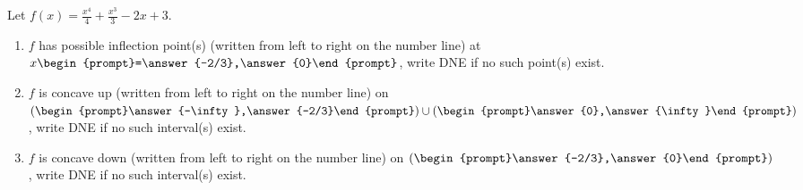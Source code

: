 \documentclass{ximera}
\author{Gregory Hartman \and Matthew Carr}
\begin{document}
\begin{exercise}




Let $f(x)=\frac{x^4}{4}+\frac{x^3}{3}-2x+3$. 
\begin{enumerate}
\item		$f$ has possible inflection point(s) (written from left to right on the number line) at $x\begin{prompt}=\answer{-2/3},\answer{0}\end{prompt}$, write DNE if no such point(s) exist.
\item		$f$ is concave up (written from left to right on the number line) on $(\begin{prompt}\answer{-\infty},\answer{-2/3}\end{prompt})\cup(\begin{prompt}\answer{0},\answer{\infty}\end{prompt})$, write DNE if no such interval(s) exist.
\item		$f$ is concave down (written from left to right on the number line) on $(\begin{prompt}\answer{-2/3},\answer{0}\end{prompt})$, write DNE if no such interval(s) exist.
\end{enumerate}

\end{exercise}
\end{document}
